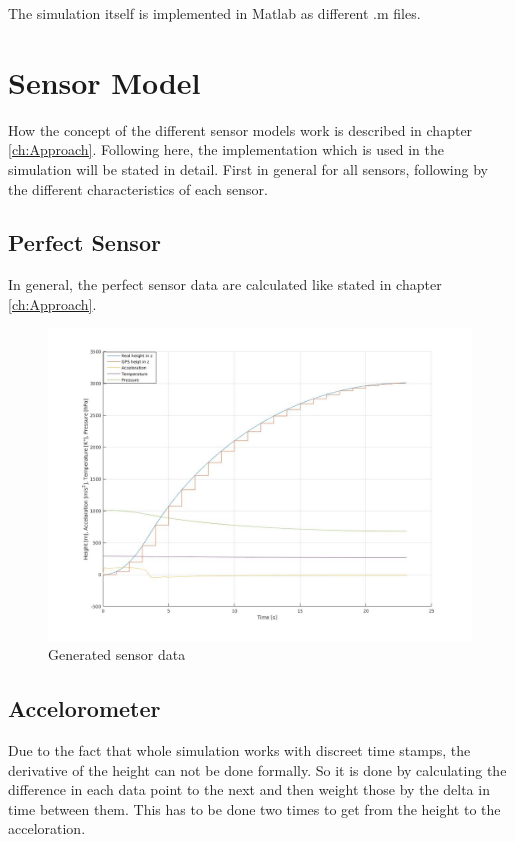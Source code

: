 
The simulation itself is implemented in Matlab as different .m files.

\section{Sensor Model}
How the concept of the different sensor models work is described in chapter \ref{ch:Approach}.
Following here, the implementation which is used in the simulation will be stated in detail.
First in general for all sensors, following by the different characteristics of each sensor.

\subsection{Perfect Sensor}
In general, the perfect sensor data are calculated like stated in chapter \ref{ch:Approach}.

\begin{figure}
 \centering
 \includegraphics[width=\textwidth]{./Pictures/GeneratedSensorData.jpg}
 \caption{Generated sensor data}
 \label{fig:GeneratedPerfectSensor}
\end{figure}

\subsection{Accelorometer}
Due to the fact that whole simulation works with discreet time stamps, the derivative of the height can not be done formally.
So it is done by calculating the difference in each data point to the next and then weight those by the delta in time between them.
This has to be done two times to get from the height to the acceloration.

